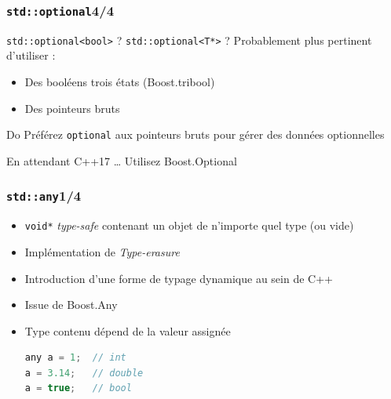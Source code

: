 \documentclass[C++.tex]{subfiles}
\begin{document}
\begin{frame}[fragile]
	\frametitle{\lstinline|std::optional|\titlehfill{}4/4}
	\begin{alertblock}{\lstinline|std::optional<bool>| ? \lstinline|std::optional<T*>| ?}
		Probablement plus pertinent d'utiliser :
		\begin{itemize}
			\item Des booléens \og trois états\fg{} (Boost.tribool)
			\item Des pointeurs bruts
		\end{itemize}
	\end{alertblock}

	\begin{exampleblock}{Do}
		Préférez \lstinline|optional| aux pointeurs bruts pour gérer des données optionnelles

	\end{exampleblock}

	\begin{block}{En attendant C++17 \ldots}
		Utilisez Boost.Optional
	\end{block}
\end{frame}

\begin{frame}[fragile]
	\frametitle{\lstinline|std::any|\titlehfill{}1/4}
	\begin{itemize}
		\item \lstinline|void*| \textit{type-safe} contenant un objet de n'importe quel type (ou vide)
		\item Implémentation de \textit{Type-erasure}
		
		
		\item Introduction d'une forme de \og typage dynamique\fg{} au sein de C++


		\item Issue de Boost.Any
		\item Type contenu dépend de la valeur assignée

	\begin{lstlisting}[language=C++]
any a = 1;  // int
a = 3.14;   // double
a = true;   // bool\end{lstlisting}
	\end{itemize}
\end{frame}
\end{document}
